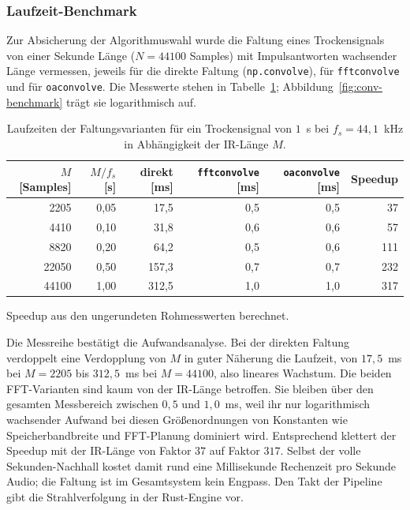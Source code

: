 \subsubsection{Laufzeit-Benchmark}
\label{subsubsec:benchmark}

Zur Absicherung der Algorithmuswahl wurde die Faltung eines Trockensignals
von einer Sekunde Länge ($N = 44100$ Samples) mit Impulsantworten wachsender
Länge vermessen, jeweils für die direkte Faltung (\texttt{np.convolve}), für
\texttt{fftconvolve} und für \texttt{oaconvolve}. Die Messwerte stehen in
Tabelle~\ref{tab:benchmark}; Abbildung~\ref{fig:conv-benchmark} trägt sie
logarithmisch auf.

\begin{table}[htbp]
    \centering
    \caption{Laufzeiten der Faltungsvarianten für ein Trockensignal von
        $1$~s bei $f_s = 44{,}1$~kHz in Abhängigkeit der IR-Länge $M$.}
    \label{tab:benchmark}
    \begin{tabular}{r r r r r r}
        \toprule
        $M$ [Samples] & $M / f_s$ [s] & direkt [ms] & \texttt{fftconvolve} [ms] & \texttt{oaconvolve} [ms] & Speedup \\
        \midrule
        2205  & 0,05 & 17,5  & 0,5 & 0,5 & 37 \\
        4410  & 0,10 & 31,8  & 0,6 & 0,6 & 57 \\
        8820  & 0,20 & 64,2  & 0,5 & 0,6 & 111 \\
        22050 & 0,50 & 157,3 & 0,7 & 0,7 & 232 \\
        44100 & 1,00 & 312,5 & 1,0 & 1,0 & 317 \\
        \bottomrule
    \end{tabular}

    \smallskip
    {\footnotesize Speedup aus den ungerundeten Rohmesswerten berechnet.}
\end{table}

Die Messreihe bestätigt die Aufwandsanalyse. Bei der direkten Faltung
verdoppelt eine Verdopplung von $M$ in guter Näherung die Laufzeit, von
$17{,}5$~ms bei $M = 2205$ bis $312{,}5$~ms bei $M = 44100$, also lineares Wachstum.
Die beiden FFT-Varianten sind kaum von der IR-Länge betroffen.
Sie bleiben über den gesamten Messbereich zwischen $0{,}5$ und $1{,}0$~ms, weil
ihr nur logarithmisch wachsender Aufwand bei diesen Größenordnungen von
Konstanten wie Speicherbandbreite und FFT-Planung dominiert wird. Entsprechend
klettert der Speedup mit der IR-Länge von Faktor $37$ auf Faktor $317$. Selbst
der volle Sekunden-Nachhall kostet damit rund eine Millisekunde Rechenzeit pro
Sekunde Audio; die Faltung ist im Gesamtsystem kein Engpass. Den Takt der
Pipeline gibt die Strahlverfolgung in der Rust-Engine vor.

